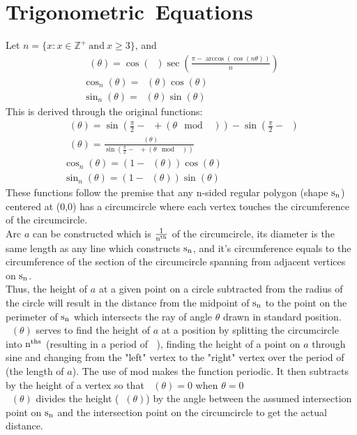 \documentclass[11pt]{article}
\DeclareMathOperator{\custd}{\mathrm{d}_n}
\DeclareMathOperator{\custh}{\mathrm{h}_n}
\DeclareMathOperator{\period}{\frac{2\pi}{n}}
\DeclareMathOperator{\hp}{\frac{\pi}{n}}
\begin{document}
\section{Trigonometric\  Equations}
Let \(n=\{x:x\in\mathbb{Z}^+\ \mathrm{and}\ x\geq3\}\), and
\begin{gather*}
   		\custd(\theta)=\cos(\hp)\sec(\frac{\pi - \arccos(\cos(n\theta))}{n})\\
   		\cos_n(\theta)=\custd(\theta)\cos(\theta)\\
   		\sin_n(\theta)=\custd(\theta)\sin(\theta)
\end{gather*}
This is derived through the original functions:
\begin{gather*}
   		\custh(\theta)=\sin(\frac{\pi}{2}-\hp+(\theta\mod\period))-\sin(\frac{\pi}{2}-\hp)\\
   		\custd(\theta)=\frac{\custh(\theta)}{\sin(\frac{\pi}{2}-\hp+(\theta\mod\period))}\\
   		\cos_n(\theta)=(1-\custd(\theta))\cos(\theta)\\
   		\sin_n(\theta)=(1-\custd(\theta))\sin(\theta)
\end{gather*}
These functions follow the premise that any n-sided regular polygon (shape \(\rm s_n\)) centered at (0,0) has a circumcircle where each vertex touches the circumference of the circumcircle. \\
Arc \(a\) can be constructed which is \(\rm \frac{1}{n^{th}}\) of the circumcircle, its diameter is the same length as any line which constructs \(\rm s_n\), and it's circumference equals to the circumference of the section of the circumcircle spanning from adjacent vertices on \(\rm s_n\). \\
Thus, the height of \(a\) at a given point on a circle subtracted from the radius of the circle will result in the distance from the midpoint of \(\rm s_n\) to the point on the perimeter of \(\rm s_n\) which intersects the ray of angle \(\theta\) drawn in standard position.\\
\(\custh(\theta)\) serves to find the height of \(a\) at a position by splitting the circumcircle into \(\rm n^{ths}\) (resulting in a period of \(\period\)), finding the height of a point on \(a\) through sine and changing from the "left" vertex to the "right" vertex over the period of \(\period\) (the length of \(a\)). The use of mod makes the function periodic. It then subtracts by the height of a vertex so that \(\custh(\theta)=0\) when \(\theta=0\)\\
\(\custd(\theta)\) divides the height (\(\custh(\theta)\)) by the angle between the assumed intersection point on \(\rm s_n\) and the intersection point on the circumcircle to get the actual distance.\\
\end{document}
